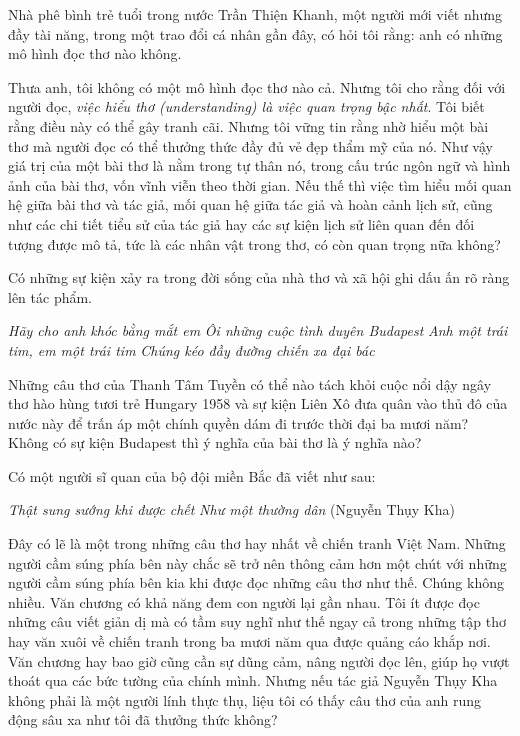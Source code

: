\documentclass[../main.tex]{subfiles}
\begin{document}
\begin{multicols}{2}
Nhà phê bình trẻ tuổi trong nước Trần Thiện Khanh, một người mới viết nhưng đầy tài năng, trong một trao đổi cá nhân gần đây, có hỏi tôi rằng: anh có những mô hình đọc thơ nào không. 

Thưa anh, tôi không có một mô hình đọc thơ nào cả. Nhưng tôi cho rằng đối với người đọc, \textit{việc hiểu thơ (understanding) là việc quan trọng bậc nhất}. Tôi biết rằng điều này có thể gây tranh cãi. Nhưng tôi vững tin rằng nhờ hiểu một bài thơ mà người đọc có thể thưởng thức đầy đủ vẻ đẹp thẩm mỹ của nó. Như vậy giá trị của một bài thơ là nằm trong tự thân nó, trong cấu trúc ngôn ngữ và hình ảnh của bài thơ, vốn vĩnh viễn theo thời gian. Nếu thế thì việc tìm hiểu mối quan hệ giữa bài thơ và tác giả, mối quan hệ giữa tác giả và hoàn cảnh lịch sử, cũng như các chi tiết tiểu sử của tác giả hay các sự kiện lịch sử liên quan đến đối tượng được mô tả, tức là các nhân vật trong thơ, có còn quan trọng nữa không? 

Có những sự kiện xảy ra trong đời sống của nhà thơ và xã hội ghi dấu ấn rõ ràng lên tác phẩm. 
\begin{blockquote}


\textit{Hãy cho anh khóc bằng mắt em} 
\textit{Ôi những cuộc tình duyên Budapest} 
\textit{Anh một trái tim, em một trái tim} 
\textit{Chúng kéo đầy đường chiến xa đại bác} 

\end{blockquote}


Những câu thơ của Thanh Tâm Tuyền có thể nào tách khỏi cuộc nổi dậy ngây thơ hào hùng tươi trẻ Hungary 1958 và sự kiện Liên Xô đưa quân vào thủ đô của nước này để trấn áp một chính quyền dám đi trước thời đại ba mươi năm? Không có sự kiện Budapest thì ý nghĩa của bài thơ là ý nghĩa nào? 

Có một người sĩ quan của bộ đội miền Bắc đã viết như sau: 
\begin{blockquote}


\textit{Thật sung sướng khi được chết} 
\textit{Như một thường dân} 
(Nguyễn Thụy Kha) 

\end{blockquote}


Đây có lẽ là một trong những câu thơ hay nhất về chiến tranh Việt Nam. Những người cầm súng phía bên này chắc sẽ trở nên thông cảm hơn một chút với những người cầm súng phía bên kia khi được đọc những câu thơ như thế. Chúng không nhiều. Văn chương có khả năng đem con người lại gần nhau. Tôi ít được đọc những câu viết giản dị mà có tầm suy nghĩ như thế ngay cả trong những tập thơ hay văn xuôi về chiến tranh trong ba mươi năm qua được quảng cáo khắp nơi. Văn chương hay bao giờ cũng cần sự dũng cảm, nâng người đọc lên, giúp họ vượt thoát qua các bức tường của chính mình. Nhưng nếu tác giả Nguyễn Thụy Kha không phải là một người lính thực thụ, liệu tôi có thấy câu thơ của anh rung động sâu xa như tôi đã thưởng thức không? 


\end{multicols}
\end{document}
